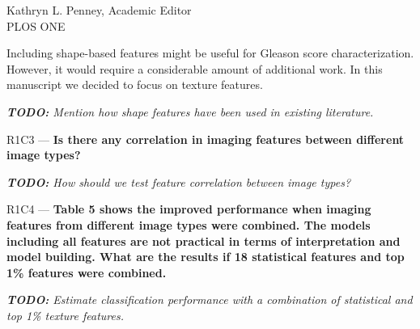 \documentclass{letter}
\newcommand{\TODO}[1]{{\emph{\textbf{TODO:} #1}}}
\newenvironment{comment}[1]%
  {\vspace{5ex}\par\textsf{#1 ---}\ignorespaces\bfseries}%
  {\par\ignorespacesafterend}
\newenvironment{reply}%
  {\vspace{2ex}\par}%
  {\par\upshape}
\begin{document}
\begin{letter}{Kathryn L. Penney, Academic Editor \\ PLOS ONE}
\begin{reply}
Including shape-based features might be useful for Gleason score
characterization. However, it would require a considerable amount of additional
work. In this manuscript we decided to focus on texture features.

\TODO{Mention how shape features have been used in existing literature.}
\end{reply}


\begin{comment}{R1C3}
Is there any correlation in imaging features between different image types?
\end{comment}

\begin{reply}
\TODO{How should we test feature correlation between image types?}
\end{reply}


\begin{comment}{R1C4}
Table 5 shows the improved performance when imaging features from different
image types were combined. The models including all features are not practical
in terms of interpretation and model building. What are the results if 18
statistical features and top 1\% features were combined.
\end{comment}

\begin{reply}
\TODO{Estimate classification performance with a combination of statistical and
top 1\% texture features.}
\end{reply}



\end{letter}
\end{document}
